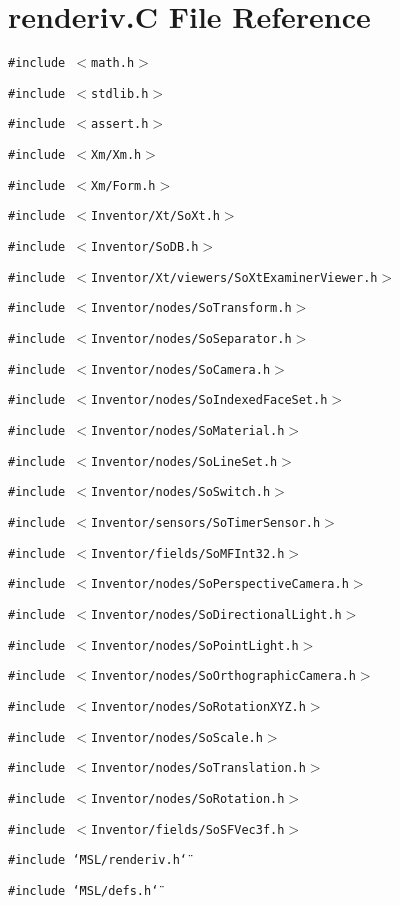 \section{renderiv.C File Reference}
\label{renderiv_8C}
{\tt \#include $<$math.h$>$}\par
{\tt \#include $<$stdlib.h$>$}\par
{\tt \#include $<$assert.h$>$}\par
{\tt \#include $<$Xm/Xm.h$>$}\par
{\tt \#include $<$Xm/Form.h$>$}\par
{\tt \#include $<$Inventor/Xt/So\-Xt.h$>$}\par
{\tt \#include $<$Inventor/So\-DB.h$>$}\par
{\tt \#include $<$Inventor/Xt/viewers/So\-Xt\-Examiner\-Viewer.h$>$}\par
{\tt \#include $<$Inventor/nodes/So\-Transform.h$>$}\par
{\tt \#include $<$Inventor/nodes/So\-Separator.h$>$}\par
{\tt \#include $<$Inventor/nodes/So\-Camera.h$>$}\par
{\tt \#include $<$Inventor/nodes/So\-Indexed\-Face\-Set.h$>$}\par
{\tt \#include $<$Inventor/nodes/So\-Material.h$>$}\par
{\tt \#include $<$Inventor/nodes/So\-Line\-Set.h$>$}\par
{\tt \#include $<$Inventor/nodes/So\-Switch.h$>$}\par
{\tt \#include $<$Inventor/sensors/So\-Timer\-Sensor.h$>$}\par
{\tt \#include $<$Inventor/fields/So\-MFInt32.h$>$}\par
{\tt \#include $<$Inventor/nodes/So\-Perspective\-Camera.h$>$}\par
{\tt \#include $<$Inventor/nodes/So\-Directional\-Light.h$>$}\par
{\tt \#include $<$Inventor/nodes/So\-Point\-Light.h$>$}\par
{\tt \#include $<$Inventor/nodes/So\-Orthographic\-Camera.h$>$}\par
{\tt \#include $<$Inventor/nodes/So\-Rotation\-XYZ.h$>$}\par
{\tt \#include $<$Inventor/nodes/So\-Scale.h$>$}\par
{\tt \#include $<$Inventor/nodes/So\-Translation.h$>$}\par
{\tt \#include $<$Inventor/nodes/So\-Rotation.h$>$}\par
{\tt \#include $<$Inventor/fields/So\-SFVec3f.h$>$}\par
{\tt \#include \char`\"{}MSL/renderiv.h\char`\"{}}\par
{\tt \#include \char`\"{}MSL/defs.h\char`\"{}}\par

